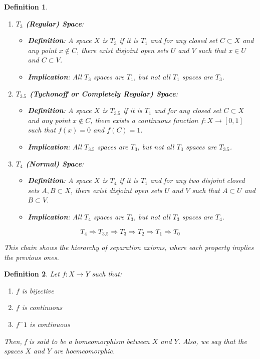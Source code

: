 \documentclass{article}
\newtheorem{definition}{Definition}[subsection]
\theoremstyle{definition}
\begin{document}
\begin{definition}
\begin{enumerate}
    \item \textbf{\(T_3\) (Regular) Space}:
    \begin{itemize}
        \item \textbf{Definition}: A space \(X\) is \(T_3\) if it is \(T_1\) and for any closed set \(C \subset X\) and any point \(x \notin C\), there exist disjoint open sets \(U\) and \(V\) such that \(x \in U\) and \(C \subset V\).
        \item \textbf{Implication}: All \(T_3\) spaces are \(T_1\), but not all \(T_1\) spaces are \(T_3\).
    \end{itemize}

    \item \textbf{\(T_{3.5}\) (Tychonoff or Completely Regular) Space}:
    \begin{itemize}
        \item \textbf{Definition}: A space \(X\) is \(T_{3.5}\) if it is \(T_1\) and for any closed set \(C \subset X\) and any point \(x \notin C\), there exists a continuous function \(f: X \to [0, 1]\) such that \(f(x) = 0\) and \(f(C) = 1\).
        \item \textbf{Implication}: All \(T_{3.5}\) spaces are \(T_3\), but not all \(T_3\) spaces are \(T_{3.5}\).
    \end{itemize}

    \item \textbf{\(T_4\) (Normal) Space}:
    \begin{itemize}
        \item \textbf{Definition}: A space \(X\) is \(T_4\) if it is \(T_1\) and for any two disjoint closed sets \(A, B \subset X\), there exist disjoint open sets \(U\) and \(V\) such that \(A \subset U\) and \(B \subset V\).
        \item \textbf{Implication}: All \(T_4\) spaces are \(T_3\), but not all \(T_3\) spaces are \(T_4\).
    \end{itemize}
\end{enumerate}



\[
T_4 \Rightarrow T_{3.5} \Rightarrow T_3 \Rightarrow T_2 \Rightarrow T_1 \Rightarrow T_0
\]

This chain shows the hierarchy of separation axioms, where each property implies the previous ones.



\end{definition}

\begin{definition}
    Let $f: X \rightarrow Y$ such that:
\begin{enumerate}
    \item $f$ is bijective
    \item $f$ is continuous
    \item $f^-1$ is continuous
\end{enumerate}
Then, f is said to be a homeomorphism between $X$ and $Y$. Also, we say that the spaces $X$ and $Y$ are hoemeomorphic.
\end{definition}
\end{document}
